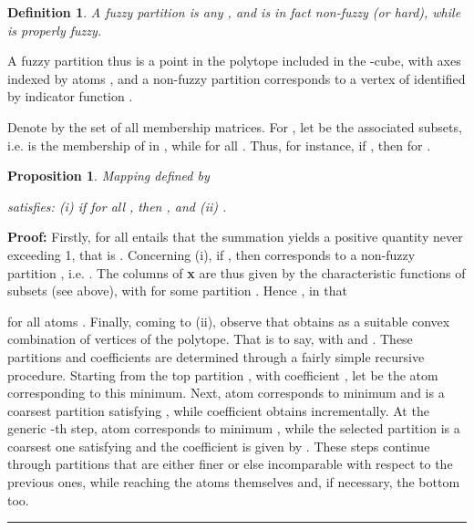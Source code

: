 \documentclass[a4paper,10pt]{article}
\newtheorem{definition}[theorem]{Definition}
\newtheorem{proposition}[theorem]{Proposition}
\newenvironment{proof}[1][Proof]{\noindent\textbf{#1: }}{\ \rule{0.5em}{0.5em}}
\begin{document}
\begin{definition}
A fuzzy partition is any ,
and  is in fact non-fuzzy (or hard), while  is properly fuzzy.
\end{definition}

A fuzzy partition thus is a point in the polytope  included in the -cube, with axes indexed by atoms , and a
non-fuzzy partition  corresponds to a vertex of  identified by indicator function . 

Denote by  the set of all membership matrices. For ,
let  be the associated subsets, i.e.  is the membership of  in , while  for all . Thus, for instance, if , then
 for .

\begin{proposition}
Mapping  defined by

satisfies: (i) if  for all , then , and (ii) .
\end{proposition}

\begin{proof}
Firstly,  for all  entails that the summation yields a positive quantity never exceeding 1, that is .
Concerning (i), if , then  corresponds to a non-fuzzy partition , i.e.
.
The  columns  of \textbf x are thus given by the  characteristic functions
 of subsets  (see above), with  for some partition . Hence , in that

for all atoms .
Finally, coming to (ii), observe that  obtains as a suitable convex combination of vertices  of the polytope. That is to say,
 with  and .
These partitions  and coefficients  are determined through a
fairly simple recursive procedure. Starting from the top partition , with coefficient ,
let  be the atom corresponding to this minimum. Next, atom  corresponds to minimum  and
 is a coarsest partition satisfying , while coefficient  obtains
incrementally. At the generic -th step, atom  corresponds to minimum , while the selected partition
 is a coarsest one satisfying  and the coefficient  is given by
. These steps continue through partitions that are either finer or else incomparable with respect to the previous
ones, while reaching the atoms themselves and, if necessary, the bottom  too.
\end{proof}
\end{document}
